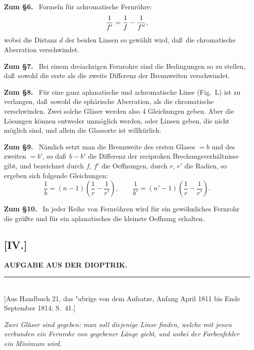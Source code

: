 \documentclass[12pt,a4paper]{article}
\theoremstyle{plain}
\theoremstyle{definition}
\theoremstyle{remark}
\begin{document}
\noindent
\textbf{Zum \S 6.} \ Formeln f\"ur achromatische Fernr\"ohre:
\[
\frac{1}{f'} = \frac{1}{f\vphantom{()}} - \frac{1}{f''},
\]
wobei die Distanz $d$ der beiden Linsen so gew\"ahlt wird, da\ss\ die
chromatische Aberration verschwindet.

\noindent
\textbf{Zum \S 7.} \ Bei einem dreiachrigen Fernrohre sind die
Bedingungen so zu stellen, da\ss\ sowohl die erste als die zweite
Differenz der Brennweiten verschwindet.

\noindent
\textbf{Zum \S 8.} \ F\"ur eine ganz aplanatische und achromatische
Linse (Fig.~L) ist zu verlangen, da\ss\ sowohl die sph\"arische
Aberration, als die chromatische verschwinden. Zwei solche Gl\"aser
werden also 4 Gleichungen geben. Aber die L\"osungen k\"onnen entweder
unm\"oglich werden, oder Linsen geben, die nicht m\"oglich sind, und
allein die Glassorte ist willk\"urlich.

\noindent
\textbf{Zum \S 9.} \ N\"amlich setzt man die Brennweite des ersten
Glases $= b$ und des zweiten $= b'$, so da\ss\ $b - b'$ die Differenz
der reciproken Brechungsverh\"altnisse gibt, und bezeichnet durch $f$,
$f'$ die Oeffnungen, durch $r$, $r'$ die Radien, so ergeben sich
folgende Gleichungen:
\[
\frac{1}{b} = (n-1)\left(\frac{1}{r} - \frac{1}{r'}\right),\qquad
\frac{1}{b'} = (n'-1)\left(\frac{1}{r} - \frac{1}{r'}\right).
\]

\noindent
\textbf{Zum \S 10.} \ In jeder Reihe von Fernr\"ohren wird f\"ur ein
gew\"ohnliches Fernrohr die gr\"o\ss te und f\"ur ein aplanatisches die
kleinste Oeffnung erhalten.


\subsection*{[IV.]}
\begin{center}
\textbf{AUFGABE AUS DER DIOPTRIK.}
\end{center}
\begin{center}
\rule{6cm}{0.4pt}\\[4pt]
[Aus Handbuch 21, das "ubrige von dem Aufsatze, Anfang April 1811
bis Ende September 1814; S.~41.]
\end{center}

\textit{Zwei Gl\"aser sind gegeben: man soll diejenige Linse finden,
welche mit jenen verbunden ein Fernrohr von gegebener L\"ange giebt,
und wobei der Farbenfehler ein Minimum wird.}
\end{document}
